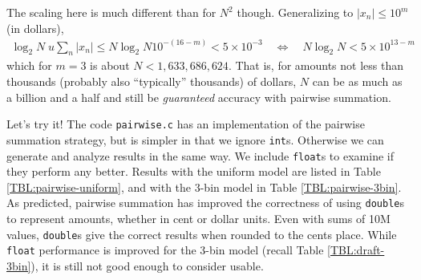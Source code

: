 \documentclass[11pt, oneside]{amsart}   	%
\begin{document}
The scaling here is much different than for $N^2$ though. Generalizing to $|x_n| \leq 10^m$ (in dollars), 
\begin{align*}
    \log_2N \; u \sum_n |x_n|
        \leq N \log_2 N 10^{-(16-m)}
        < 5 \times 10^{-3}
        \quad\iff\quad 
        N \log_2 N < 5 \times 10^{13-m}
\end{align*}
which for $m = 3$ is about $N < 1,633,686,624$. That is, for amounts not less than thousands (probably also ``typically'' thousands) of dollars, $N$ can be as much as a billion and a half and still be {\em guaranteed} accuracy with pairwise summation. 

Let's try it! The code \texttt{pairwise.c} has an implementation of the pairwise summation strategy, but is simpler in that we ignore \texttt{int}s. Otherwise we can generate and analyze results in the same way. We include \texttt{float}s to examine if they perform any better. Results with the uniform model are listed in Table \ref{TBL:pairwise-uniform}, and with the 3-bin model in Table \ref{TBL:pairwise-3bin}. As predicted, pairwise summation has improved the correctness of using \texttt{double}s to represent amounts, whether in cent or dollar units. Even with sums of 10M values, \texttt{double}s give the correct results when rounded to the cents place. While \texttt{float} performance is improved for the 3-bin model (recall Table \ref{TBL:draft-3bin}), it is still not good enough to consider usable. 
\end{document}
